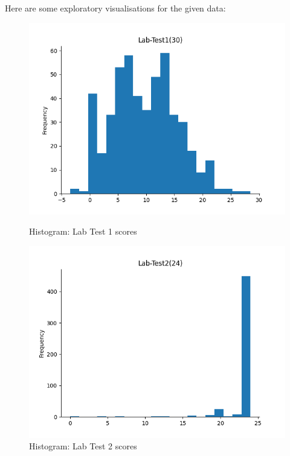 Here are some exploratory visualisations for the given data:

\begin{figure}[htbp]
    \centering
    \begin{minipage}[b]{0.45\textwidth}
        \centering
        \includegraphics[width=\textwidth]{images/data_lab_test1.png}
        \caption*{Histogram: Lab Test 1 scores}
        \label{fig:image1}
    \end{minipage}
    \hfill
    \begin{minipage}[b]{0.45\textwidth}
        \centering
        \includegraphics[width=\textwidth]{images/data_lab_test2.png}
        \caption*{Histogram: Lab Test 2 scores}
        \label{fig:image2}
    \end{minipage}
    \label{fig:overall}
\end{figure}

